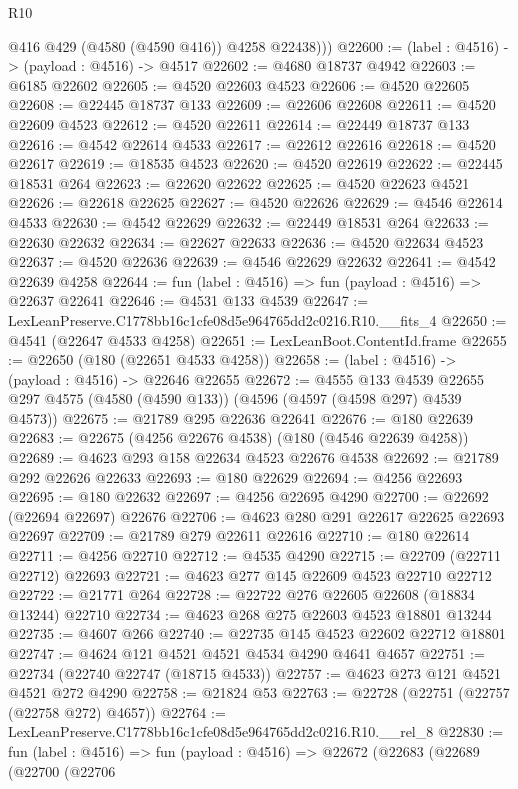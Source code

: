\begin{lexlean}{R10}
\begin{coremodule}
          @416
          @429
          (@4580 (@4590 @416))
          @4258
          @22438)))
@22600 := (label : @4516) -> (payload : @4516) -> @4517
@22602 := @4680 @18737 @4942
@22603 := @6185 @22602
@22605 := @4520 @22603 @4523
@22606 := @4520 @22605
@22608 := @22445 @18737 @133
@22609 := @22606 @22608
@22611 := @4520 @22609 @4523
@22612 := @4520 @22611
@22614 := @22449 @18737 @133
@22616 := @4542 @22614 @4533
@22617 := @22612 @22616
@22618 := @4520 @22617
@22619 := @18535 @4523
@22620 := @4520 @22619
@22622 := @22445 @18531 @264
@22623 := @22620 @22622
@22625 := @4520 @22623 @4521
@22626 := @22618 @22625
@22627 := @4520 @22626
@22629 := @4546 @22614 @4533
@22630 := @4542 @22629
@22632 := @22449 @18531 @264
@22633 := @22630 @22632
@22634 := @22627 @22633
@22636 := @4520 @22634 @4523
@22637 := @4520 @22636
@22639 := @4546 @22629 @22632
@22641 := @4542 @22639 @4258
@22644 := fun (label : @4516) => fun (payload : @4516) => @22637 @22641
@22646 := @4531 @133 @4539
@22647 := LexLeanPreserve.C1778bb16c1cfe08d5e964765dd2c0216.R10.__fits_4
@22650 := @4541 (@22647 @4533 @4258)
@22651 := LexLeanBoot.ContentId.frame
@22655 := @22650 (@180 (@22651 @4533 @4258))
@22658 := (label : @4516) -> (payload : @4516) -> @22646 @22655
@22672 := @4555
    @133
    @4539
    @22655
    @297
    @4575
    (@4580 (@4590 @133))
    (@4596 (@4597 (@4598 @297) @4539 @4573))
@22675 := @21789 @295 @22636 @22641
@22676 := @180 @22639
@22683 := @22675 (@4256 @22676 @4538) (@180 (@4546 @22639 @4258))
@22689 := @4623 @293 @158 @22634 @4523 @22676 @4538
@22692 := @21789 @292 @22626 @22633
@22693 := @180 @22629
@22694 := @4256 @22693
@22695 := @180 @22632
@22697 := @4256 @22695 @4290
@22700 := @22692 (@22694 @22697) @22676
@22706 := @4623 @280 @291 @22617 @22625 @22693 @22697
@22709 := @21789 @279 @22611 @22616
@22710 := @180 @22614
@22711 := @4256 @22710
@22712 := @4535 @4290
@22715 := @22709 (@22711 @22712) @22693
@22721 := @4623 @277 @145 @22609 @4523 @22710 @22712
@22722 := @21771 @264
@22728 := @22722 @276 @22605 @22608 (@18834 @13244) @22710
@22734 := @4623 @268 @275 @22603 @4523 @18801 @13244
@22735 := @4607 @266
@22740 := @22735 @145 @4523 @22602 @22712 @18801
@22747 := @4624 @121 @4521 @4521 @4534 @4290 @4641 @4657
@22751 := @22734 (@22740 @22747 (@18715 @4533))
@22757 := @4623 @273 @121 @4521 @4521 @272 @4290
@22758 := @21824 @53
@22763 := @22728 (@22751 (@22757 (@22758 @272) @4657))
@22764 := LexLeanPreserve.C1778bb16c1cfe08d5e964765dd2c0216.R10.__rel_8
@22830 := fun (label : @4516) =>
  fun (payload : @4516) =>
  @22672
    (@22683
      (@22689
        (@22700
          (@22706

\end{coremodule}
\end{lexlean}
